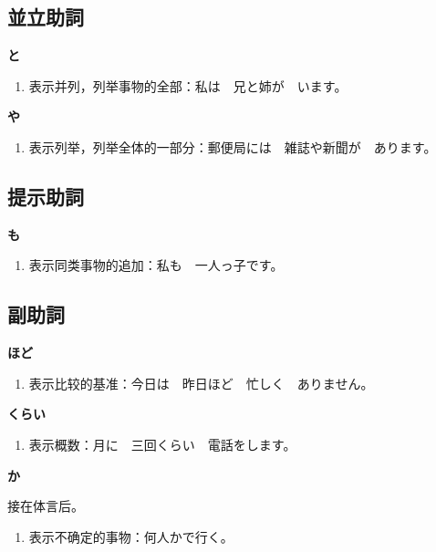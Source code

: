 \subsection{並立助詞}%

{\bf
\noindent と
}

\begin{enumerate}
  \item 表示并列，列举事物的全部：私は　兄と姉が　います。
\end{enumerate}


{\bf
\noindent や
}

\begin{enumerate}
  \item 表示列举，列举全体的一部分：郵便局には　雑誌や新聞が　あります。
\end{enumerate}


\subsection{提示助詞}%

{\bf
\noindent も
}

\begin{enumerate}
  \item 表示同类事物的追加：私も　一人っ子です。
\end{enumerate}


\subsection{副助詞}%

{\bf
\noindent ほど
}

\begin{enumerate}
  \item 表示比较的基准：今日は　昨日ほど　忙しく　ありません。
\end{enumerate}

{\bf
\noindent くらい 
}

\begin{enumerate}
  \item 表示概数：月に　三回くらい　電話をします。
\end{enumerate}

{\bf
\noindent か
}

接在体言后。
\begin{enumerate}
  \item 表示不确定的事物：何人かで行く。
\end{enumerate}

